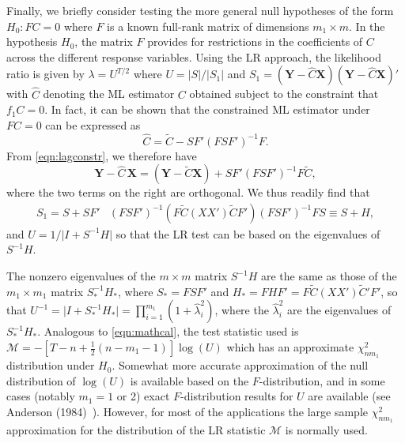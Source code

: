 Finally, we briefly consider testing the more general null hypotheses of the form $H_0: FC=0$ where $F$ is a known full-rank matrix of dimensions $m_1 \times m$. In the hypothesis $H_0$, the matrix $F$ provides for restrictions in the coefficients of $C$ across the different response variables. Using the LR approach, the likelihood ratio is given by $\lambda= U^{T/2}$ where $U= |S|/|S_1|$ and $S_1= (\mathbf{Y} - \hat{C}\mathbf{X})(\mathbf{Y}  - \hat{C}\mathbf{X})'$ with $\hat{C}$ denoting the ML estimator $C$ obtained subject to the constraint that $f_1C=0$. In fact, it can be shown that the constrained ML estimator under $FC= 0$ can be expressed as
	\begin{equation} \label{eqn:lagconstr}
	\hat{C}= \tilde{C} - SF'(FSF')^{-1} F.
	\end{equation}
From \eqref{eqn:lagconstr}, we therefore have
	\begin{equation} \label{eqn:boldys}
	\mathbf{Y} - \hat{C} \,\mathbf{X}= ( \mathbf{Y} - \tilde{C} \mathbf{X}  ) + SF'(FSF')^{-1} F \tilde{C},
	\end{equation}
where the two terms on the right are orthogonal. We thus readily find that
	\begin{equation} \label{eqn:lastdouble5}
	\begin{split}
	S_1= S + SF'&(FSF')^{-1}( F\tilde{C} (XX') \tilde{C} F' )(FSF')^{-1} FS \equiv S + H,
	\end{split}
	\end{equation}
and $U= 1/\lvert I + S^{-1}H \rvert$ so that the LR test can be based on the eigenvalues of $S^{-1}H$.


The nonzero eigenvalues of the $m \times m$ matrix $S^{-1} H$ are the same as those of the $m_1 \times m_1$ matrix $S_*^{-1} H_*$, where $S_*= FSF'$ and $H_* = FHF' = F \tilde{C} (XX') \tilde{C}' F'$, so that $U^{-1} = \lvert I + S_*^{-1} H_* \rvert= \prod_{i=1}^{m_1} (1 + \hat{\lambda}_i^2 )$, where the $\hat{\lambda}_i^2$ are the eigenvalues of $S_*^{-1} H_*$. Analogous to \eqref{eqn:mathcal}, the test statistic used is $\mathcal{M}= -[T - n + \frac{1}{2}(n - m_1 - 1)]\log(U)$ which has an approximate $\chi_{nm_1}^2$ distribution under $H_0$. Somewhat more accurate approximation of the null distribution of $\log(U)$ is available based on the $F$-distribution, and in some cases (notably $m_1= 1$ or 2) exact $F$-distribution results for $U$ are available (see Anderson (1984)~\cite[Chap. 8]{andersontw2}). However, for most of the applications the large sample $\chi_{nm_1}^2$ approximation for the distribution of the LR statistic $\mathcal{M}$ is normally used. \twomedskip



